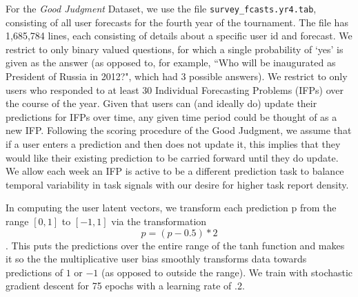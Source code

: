 \documentclass{article}
\begin{document}
For the \emph{Good Judgment} Dataset, we use the file \texttt{survey\_fcasts.yr4.tab}, consisting of all user forecasts for the fourth year of the tournament. The file has 1,685,784 lines, each consisting of details about a specific user id and forecast. We restrict to only binary valued questions, for which a single probability of `yes' is given as the answer (as opposed to, for example, ``Who will be inaugurated as President of Russia in 2012?", which had 3 possible answers). We restrict to only users who responded to at least 30 Individual Forecasting Problems (IFPs) over the course of the year. Given that users can (and ideally do) update their predictions for IFPs over time, any given time period could be thought of as a new IFP. Following the scoring procedure of the Good Judgment, we assume that if a user enters a prediction and then does not update it, this implies that they would like their existing prediction to be carried forward until they do update. We allow each week an IFP is active to be a different prediction task to balance temporal variability in task signals with our desire for higher task report density.

In computing the user latent vectors, we transform each prediction p from the range $[0,1]$ to $[-1, 1]$ via the transformation $$p = (p - 0.5) * 2$$. This puts the predictions over the entire range of the tanh function and makes it so the the multiplicative user bias smoothly transforms data towards predictions of $1$ or $-1$ (as opposed to outside the range). We train with stochastic gradient descent for 75 epochs with a learning rate of .2. 
\end{document}
